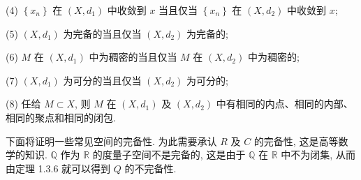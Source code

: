 \documentclass[openany]{ctexbook}
\theoremstyle{kaiti}
\theoremstyle{normal}
\begin{document}
(4) $\left\{x_n\right\}$ 在 $\left(X, d_1\right)$ 中收敛到 $x$ 当且仅当 $\left\{x_n\right\}$ 在 $\left(X, d_2\right)$ 中收敛到 $x$;

(5) $\left(X, d_1\right)$ 为完备的当且仅当 $\left(X, d_2\right)$ 为完备的;

(6) $M$ 在 $\left(X, d_1\right)$ 中为稠密的当且仅当 $M$ 在 $\left(X, d_2\right)$ 中为稠密的;

(7) $\left(X, d_1\right)$ 为可分的当且仅当 $\left(X, d_2\right)$ 为可分的;

(8) 任给 $M \subset X$, 则 $M$ 在 $\left(X, d_1\right)$ 及 $\left(X, d_2\right)$ 中有相同的内点、相同的内部、相同的聚点和相同的闭包.

下面将证明一些常见空间的完备性. 为此需要承认 $R$ 及 $C$ 的完备性, 这是高等数学的知识. $\mathbb{Q}$ 作为 $\mathbb{R}$ 的度量子空间不是完备的, 这是由于 $\mathbb{Q}$ 在 $\mathbb{R}$ 中不为闭集, 从而由定理 1.3.6 就可以得到 $Q$ 的不完备性.
\end{document}
